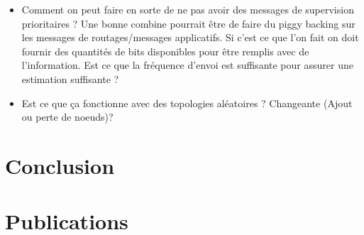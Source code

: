\begin{itemize}
	\item Comment on peut faire en sorte de ne pas avoir des messages de supervision prioritaires ? Une bonne combine pourrait être de faire du piggy backing sur les messages de routages/messages applicatifs. Si c'est ce que l'on fait on doit fournir des quantités de bits disponibles pour être remplis avec de l'information. Est ce que la fréquence d'envoi est suffisante pour assurer une estimation suffisante ?

	\item Est ce que ça fonctionne avec des topologies aléatoires ? Changeante (Ajout ou perte de noeuds)?

\end{itemize}



\section{Conclusion} %
\label{sec:estimators_conclusion}

\lipsum


\section{Publications} %
\label{sec:estimators_publications}


